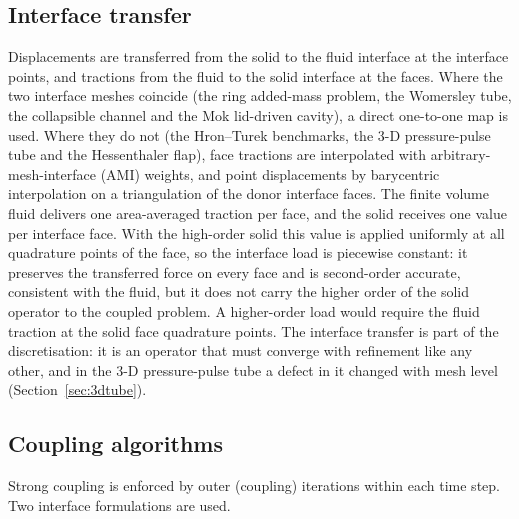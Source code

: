 \subsection{Interface transfer}\label{sec:interface_transfer}

Displacements are transferred from the solid to the fluid interface at the interface points, and tractions from the fluid to the solid interface at the faces.
Where the two interface meshes coincide (the ring added-mass problem, the Womersley tube, the collapsible channel and the Mok lid-driven cavity), a direct one-to-one map is used.
Where they do not (the Hron--Turek benchmarks, the 3-D pressure-pulse tube and the Hessenthaler flap), face tractions are interpolated with arbitrary-mesh-interface (AMI) weights, and point displacements by barycentric interpolation on a triangulation of the donor interface faces.
The finite volume fluid delivers one area-averaged traction per face, and the solid receives one value per interface face.
With the high-order solid this value is applied uniformly at all quadrature points of the face, so the interface load is piecewise constant: it preserves the transferred force on every face and is second-order accurate, consistent with the fluid, but it does not carry the higher order of the solid operator to the coupled problem.
A higher-order load would require the fluid traction at the solid face quadrature points.
The interface transfer is part of the discretisation: it is an operator that must converge with refinement like any other, and in the 3-D pressure-pulse tube a defect in it changed with mesh level (Section~\ref{sec:3dtube}).

\subsection{Coupling algorithms}\label{sec:coupling_algorithms}

Strong coupling is enforced by outer (coupling) iterations within each time step.
Two interface formulations are used.

